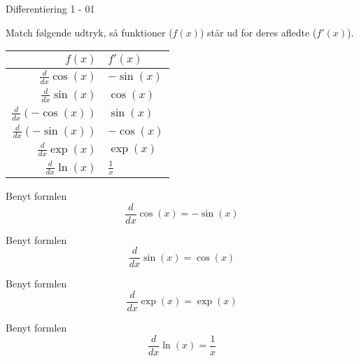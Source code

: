 \documentclass{article}
\newenvironment{sortingwidget}[2]{\begin{tabular}{|r|l|}
\hline #1 & #2 \\ \hline}{\hline
\end{tabular}}
\begin{document}
\tableofcontents
\newpage


\begin{exercise}{Differentiering 1 - 01}

Match følgende udtryk, så funktioner ($f(x)$) står 
ud for deres afledte ($f'(x)$).


\begin{sortingwidget}{$f(x)$}{$f'(x)$}
$\frac{d}{dx} \cos(x)$ & $-\sin(x)$\\
$\frac{d}{dx} \sin(x)$ & $\cos(x)$ \\
$\frac{d}{dx} \left( - \cos(x) \right)$ & $\sin(x)$ \\
$\frac{d}{dx} \left( - \sin(x) \right)$ & $-\cos(x)$ \\
$\frac{d}{dx} \exp(x)$ & $\exp(x)$ \\
$\frac{d}{dx} \ln(x)$ & $\frac{1}{x}$ \\
\end{sortingwidget}


\hint
Benyt formlen
\[
\frac{d}{dx} \cos(x) = -\sin(x)
\]


\hint
Benyt formlen
\[
\frac{d}{dx} \sin(x) = \cos(x)
\]


\hint
Benyt formlen
\[
\frac{d}{dx} \exp(x) = \exp(x)
\]

\hint
Benyt formlen
\[
\frac{d}{dx} \ln(x) = \frac{1}{x}
\]



\end{exercise}
\end{document}

